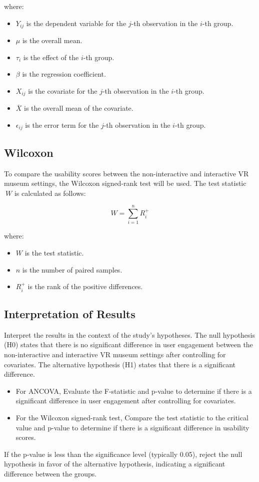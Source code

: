 \documentclass[conference]{IEEEtran}
\begin{document}
where:
\begin{itemize}
    \item \( Y_{ij} \) is the dependent variable for the \( j \)-th observation in the \( i \)-th group.
    \item \( \mu \) is the overall mean.
    \item \( \tau_i \) is the effect of the \( i \)-th group.
    \item \( \beta \) is the regression coefficient.
    \item \( X_{ij} \) is the covariate for the \( j \)-th observation in the \( i \)-th group.
    \item \( \overline{X} \) is the overall mean of the covariate.
    \item \( \epsilon_{ij} \) is the error term for the \( j \)-th observation in the \( i \)-th group.
\end{itemize}

\subsection{Wilcoxon}
To compare the usability scores between the non-interactive and interactive VR museum settings, the Wilcoxon signed-rank test will be used. The test statistic \( \ W \) is calculated as follows:

\[
W = \sum_{i=1}^n R_i^+
\]

where:
\begin{itemize}
    \item \( W \) is the test statistic.
    \item \( n \) is the number of paired samples.
    \item \( R_i^+ \) is the rank of the positive differences.
\end{itemize}

\subsection{Interpretation of Results} 
Interpret the results in the context of the study's hypotheses. The null hypothesis (H0) states that there is no significant difference in user engagement between the non-interactive and interactive VR museum settings after controlling for covariates. The alternative hypothesis (H1) states that there is a significant difference.

\begin{itemize}
    \item For ANCOVA, Evaluate the F-statistic and p-value to determine if there is a significant difference in user engagement after controlling for covariates.
\item For the Wilcoxon signed-rank test, Compare the test statistic to the critical value and p-value to determine if there is a significant difference in usability scores.
\end{itemize}
If the p-value is less than the significance level (typically 0.05), reject the null hypothesis in favor of the alternative hypothesis, indicating a significant difference between the groups.
\end{document}
